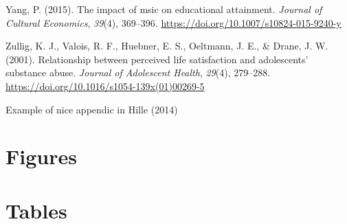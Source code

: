 \documentclass[a4, 12pt]{article}
\begin{document}
\leavevmode\hypertarget{ref-Yang2015}{}%
Yang, P. (2015). The impact of msic on educational attainment. \emph{Journal of Cultural Economics}, \emph{39}(4), 369--396. \url{https://doi.org/10.1007/s10824-015-9240-y}

\leavevmode\hypertarget{ref-Zullig2001}{}%
Zullig, K. J., Valois, R. F., Huebner, E. S., Oeltmann, J. E., \& Drane, J. W. (2001). Relationship between perceived life satisfaction and adolescents' substance abuse. \emph{Journal of Adolescent Health}, \emph{29}(4), 279--288. \url{https://doi.org/10.1016/s1054-139x(01)00269-5}

\clearpage

\hypertarget{appendix-appendix}{%
\appendix}


Example of nice appendic in Hille (2014)

\hypertarget{figures}{%
\section{Figures}\label{figures}}

\clearpage

\hypertarget{tables}{%
\section{Tables}\label{tables}}
\end{document}
